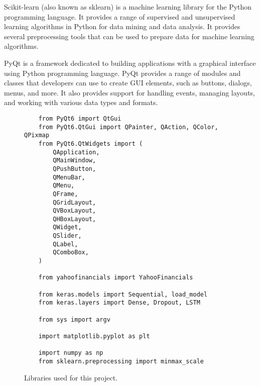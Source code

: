 \par
\bigskip
Scikit-learn (also known as sklearn) is a machine learning library for the Python programming language. It provides a range of supervised and unsupervised learning algorithms in Python for data mining and data analysis. It provides several preprocessing tools that can be used to prepare data for machine learning algorithms.
\par
\bigskip
PyQt is a framework dedicated to building applications with a graphical interface using Python programming language. PyQt provides a range of modules and classes that developers can use to create GUI elements, such as buttons, dialogs, menus, and more. It also provides support for handling events, managing layouts, and working with various data types and formats.
\clearpage
\begin{figure}
\centering
\begin{lstlisting}
    from PyQt6 import QtGui
    from PyQt6.QtGui import QPainter, QAction, QColor, QPixmap
    from PyQt6.QtWidgets import (
        QApplication,
        QMainWindow,
        QPushButton,
        QMenuBar,
        QMenu,
        QFrame,
        QGridLayout,
        QVBoxLayout,
        QHBoxLayout,
        QWidget,
        QSlider,
        QLabel,
        QComboBox,
    )
    
    from yahoofinancials import YahooFinancials
    
    from keras.models import Sequential, load_model
    from keras.layers import Dense, Dropout, LSTM
    
    from sys import argv
    
    import matplotlib.pyplot as plt
    
    import numpy as np
    from sklearn.preprocessing import minmax_scale
\end{lstlisting}
\caption{Libraries used for this project.}
\label{fig:pseudocode:listings}
\end{figure}

